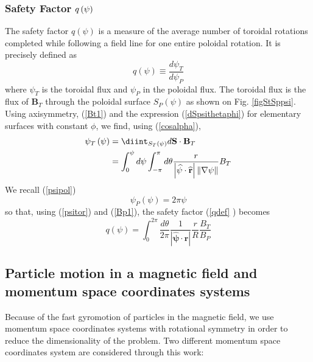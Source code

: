 \subsubsection{Safety Factor $q\left( \protect\psi\right) $}

The safety factor $q\left( \psi\right) $ is a measure of the average number
of toroidal rotations completed while following a field line for one entire
poloidal rotation. It is precisely defined as%
\begin{equation}
q\left( \psi\right) \equiv\dfrac{d\psi_{T}}{d\psi_{P}}   \label{qdef}
\end{equation}
where $\psi_{T}$ is the toroidal flux and $\psi_{P}$ in the poloidal flux.
The toroidal flux is the flux of $\mathbf{B}_{T}$ through the poloidal
surface $S_{P}\left( \psi\right) $ as shown on Fig. \ref{figStSppsi}. Using
axisymmetry, (\ref{Bt1}) and the expression (\ref{dSpsithetaphi}) for
elementary surfaces with constant $\phi$, we find, using (\ref{cosalpha}),%
\begin{align}
\psi_{T}\left( \psi\right) & =\diint _{S_{T}\left( \psi\right) }d\mathbf{S}%
\cdot\mathbf{B}_{T}  \notag \\
& =\int_{0}^{\psi}d\psi\int_{-\pi}^{\pi}d\theta\dfrac{r}{\left\vert \widehat{%
\mathbf{\psi}}\cdot\widehat{\mathbf{r}}\right\vert \left\Vert \mathbf{\nabla}%
\psi\right\Vert }B_{T}   \label{psitor}
\end{align}
We recall (\ref{psipol})%
\begin{equation}
\psi_{P}\left( \psi\right) =2\pi\psi
\end{equation}
so that, using (\ref{psitor}) and (\ref{Bp1}), the safety factor (\ref{qdef}%
) becomes%
\begin{equation}
q\left( \psi\right) =\int_{0}^{2\pi}\frac{d\theta}{2\pi}\frac{1}{\left\vert 
\widehat{\mathbf{\psi}}\cdot\widehat{\mathbf{r}}\right\vert }\frac{r}{R}%
\frac{B_{T}}{B_{P}}   \label{qfactor}
\end{equation}

\subsection{Particle motion in a magnetic field and momentum space
coordinates systems}

Because of the fast gyromotion of particles in the magnetic field, we use
momentum space coordinates systems with rotational symmetry in order to
reduce the dimensionality of the problem. Two different momentum space
coordinates system are considered through this work:

